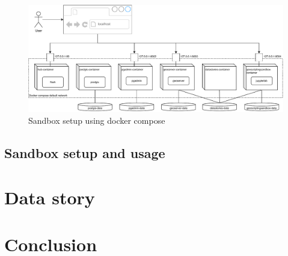 \documentclass[11pt, a4paper, oneside, parskip=full-]{scrartcl}
\begin{document}
\begin{figure}[H]
  \centering
  \includegraphics[width=1\textwidth]{composeSetup}
  \caption{Sandbox setup using docker compose}
  \label{fig:sandboxsetup}
\end{figure}


\subsection{Sandbox setup and usage}


\section{Data story}


\section{Conclusion}


\printbibliography
\end{document}
